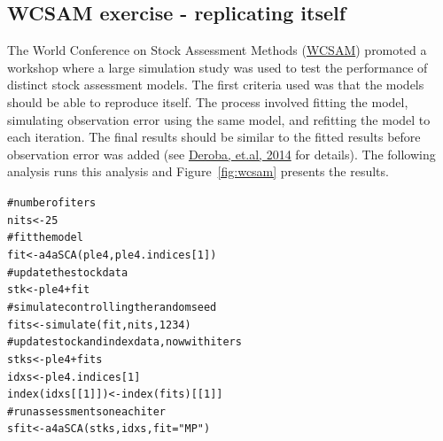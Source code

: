 \documentclass[a4paper,english,10pt]{article}\usepackage[]{graphicx}\usepackage[]{color}
\makeatletter
\newcommand{\hlnum}[1]{\textcolor[rgb]{0.063,0.58,0.627}{#1}}%
\newcommand{\hlstr}[1]{\textcolor[rgb]{0.063,0.58,0.627}{#1}}%
\newcommand{\hlcom}[1]{\textcolor[rgb]{0.588,0.588,0.588}{#1}}%
\newcommand{\hlopt}[1]{\textcolor[rgb]{0.196,0.196,0.196}{#1}}%
\newcommand{\hlstd}[1]{\textcolor[rgb]{0.196,0.196,0.196}{#1}}%
\newcommand{\hlkwb}[1]{\textcolor[rgb]{0.627,0,0.314}{#1}}%
\newcommand{\hlkwc}[1]{\textcolor[rgb]{0,0.631,0.314}{#1}}%
\newcommand{\hlkwd}[1]{\textcolor[rgb]{0.78,0.227,0.412}{#1}}%
\newenvironment{kframe}{%
 \def\at@end@of@kframe{}%
 \ifinner\ifhmode%
  \def\at@end@of@kframe{\end{minipage}}%
  \begin{minipage}{\columnwidth}%
 \fi\fi%
 \def\FrameCommand##1{\hskip\@totalleftmargin \hskip-\fboxsep
 \colorbox{shadecolor}{##1}\hskip-\fboxsep
     \hskip-\linewidth \hskip-\@totalleftmargin \hskip\columnwidth}%
 \MakeFramed {\advance\hsize-\width
   \@totalleftmargin\z@ \linewidth\hsize
   \@setminipage}}%
 {\par\unskip\endMakeFramed%
 \at@end@of@kframe}
\newenvironment{knitrout}{}{} %
\makeatother
\begin{document}


\subsection{WCSAM exercise - replicating itself}

The World Conference on Stock Assessment Methods (\href{http://www.ices.dk/news-and-events/symposia/WCSAM-2013}{WCSAM}) promoted a workshop where a large simulation study was used to test the performance of distinct stock assessment models. The first criteria used was that the models should be able to reproduce itself. The process involved fitting the model, simulating observation error using the same model, and refitting the model to each iteration. The final results should be similar to the fitted results before observation error was added (see \href{http://icesjms.oxfordjournals.org/content/early/2014/01/18/icesjms.fst237.abstract}{Deroba, et.al, 2014} for details). The following analysis runs this analysis and Figure~\ref{fig:wcsam} presents the results.

\begin{knitrout}
\color{fgcolor}\begin{kframe}
\begin{alltt}
\hlcom{# number of iters}
\hlstd{nits} \hlkwb{<-} \hlnum{25}
\hlcom{# fit the model}
\hlstd{fit} \hlkwb{<-} \hlkwd{a4aSCA}\hlstd{(ple4, ple4.indices[}\hlnum{1}\hlstd{])}
\hlcom{# update the stock data}
\hlstd{stk} \hlkwb{<-} \hlstd{ple4} \hlopt{+} \hlstd{fit}
\hlcom{# simulate controlling the random seed}
\hlstd{fits} \hlkwb{<-} \hlkwd{simulate}\hlstd{(fit, nits,} \hlnum{1234}\hlstd{)}
\hlcom{# update stock and index data, now with iters}
\hlstd{stks} \hlkwb{<-} \hlstd{ple4} \hlopt{+} \hlstd{fits}
\hlstd{idxs} \hlkwb{<-} \hlstd{ple4.indices[}\hlnum{1}\hlstd{]}
\hlkwd{index}\hlstd{(idxs[[}\hlnum{1}\hlstd{]])} \hlkwb{<-} \hlkwd{index}\hlstd{(fits)[[}\hlnum{1}\hlstd{]]}
\hlcom{# run assessments on each iter}
\hlstd{sfit} \hlkwb{<-} \hlkwd{a4aSCA}\hlstd{(stks, idxs,} \hlkwc{fit} \hlstd{=} \hlstr{"MP"}\hlstd{)}
\end{alltt}
\end{kframe}
\end{knitrout}
\end{document}
